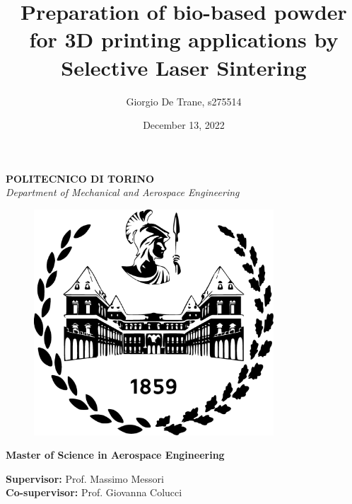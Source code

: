 \documentclass[a4paper]{article}
\author{Giorgio De Trane, s275514}
\title{\textbf{Preparation of bio-based powder for 3D printing applications by Selective Laser Sintering}}
\date{December 13, 2022}
\begin{document}
    \setlength{\parindent}{0pt}

    \begin{titlepage}
        \pagestyle{empty}
    \maketitle
    \begin{center}
        \textbf{POLITECNICO DI TORINO} \\ 
        \textit{Department of Mechanical and Aerospace Engineering} \\
    \end{center}

    \begin{figure}[ht]
        \centering
        \includegraphics[width=0.8\textwidth]{Pictures/polito_logo.eps}  
        \label{fig:polito_logo}      
    \end{figure}

    \begin{center} 
        \textbf{Master of Science in Aerospace Engineering} \\
    \end{center}


    \begin{center}
        \textbf{Supervisor:} Prof. Massimo Messori \\
        \textbf{Co-supervisor:} Prof. Giovanna Colucci \\
    \end{center}
    
    \end{titlepage}
\end{document}
